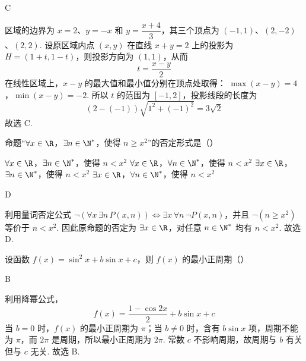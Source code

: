\begin{answer}
C
\end{answer}

\begin{solution}
区域的边界为 \(x=2\)、\(y=-x\) 和 \(y=\dfrac{x+4}{3}\)，其三个顶点为
\((-1,1)\)、\((2,-2)\)、\((2,2)\). 设原区域内点 \((x,y)\) 在直线 \(x+y=2\) 上的投影为
\(H=(1+t,1-t)\)，则投影方向为 \((1,1)\)，从而
\[
t=\frac{x-y}{2}
\]
在线性区域上，\(x-y\) 的最大值和最小值分别在顶点处取得：
\(\max(x-y)=4\)，\(\min(x-y)=-2\).
所以 \(t\) 的范围为 \([-1,2]\)，投影线段的长度为
\[
(2-(-1))\sqrt{1^2+(-1)^2}=3\sqrt2
\]
故选 C.
\end{solution}

\begin{problem}
命题“\( \forall x\in\R \)，\( \exists n\in\N^* \)，使得 \( n\ge x^2 \)”的否定形式是（\quad）

\choices
    {\( \forall x\in\R \)，\( \exists n\in\N^* \)，使得 \( n<x^2 \)}
    {\( \forall x\in\R \)，\( \forall n\in\N^* \)，使得 \( n<x^2 \)}
    {\( \exists x\in\R \)，\( \exists n\in\N^* \)，使得 \( n<x^2 \)}
    {\( \exists x\in\R \)，\( \forall n\in\N^* \)，使得 \( n<x^2 \)}
\end{problem}

\begin{answer}
D
\end{answer}

\begin{solution}
利用量词否定公式
\(\neg(\forall x\,\exists n\,P(x,n))\iff\exists x\,\forall n\,\neg P(x,n)\)，并且
\(\neg(n\geqslant x^2)\) 等价于 \(n<x^2\). 因此原命题的否定为
\(\exists x\in\R\)，对任意 \(n\in\N^*\) 均有 \(n<x^2\).
故选 D.
\end{solution}

\begin{problem}
设函数 \( f(x)=\sin^2x+b\sin x+c \)，则 \( f(x) \) 的最小正周期（\quad）

\choices
    {}
    {}
    {}
    {}
\end{problem}

\begin{answer}
B
\end{answer}

\begin{solution}
利用降幂公式，
\[
f(x)=\frac{1-\cos2x}{2}+b\sin x+c
\]
当 \(b=0\) 时，\(f(x)\) 的最小正周期为 \(\pi\)；当 \(b\ne0\) 时，含有 \(b\sin x\) 项，周期不能为 \(\pi\)，而 \(2\pi\) 是周期，所以最小正周期为 \(2\pi\). 常数 \(c\) 不影响周期，故周期与 \(b\) 有关但与 \(c\) 无关.
故选 B.
\end{solution}

